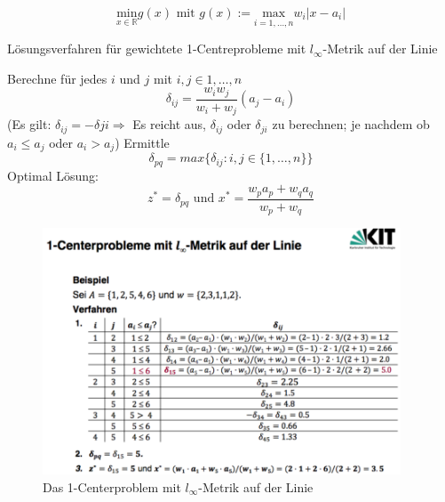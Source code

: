           \[
            \underset{x \in \mathbb{R}}{\text{min}}g(x) \text{ mit } g(x) := \underset{i = 1, \dots, n}{\text{max}}w_i|x-a_i|
          \]
          \begin{algorithm}[H]
            \caption{Lösungsverfahren für gewichtete 1-Centreprobleme mit $l_{\infty}$-Metrik auf der Linie}
            \begin{algorithmic}[1]
              \State Berechne für jedes $i$ und $j$ mit $i, j \in {1, \dots, n}$
              \begin{equation*}
                \delta_{ij} = \frac{w_iw_j}{w_i+w_j}(a_j - a_i)
              \end{equation*}
              (Es gilt: $\delta_{ij} = -\delta{ji} \Rightarrow $ Es reicht aus, $\delta_{ij}$ oder $\delta_{ji}$ zu berechnen; je nachdem ob $a_i \leq a_j$ oder $a_i > a_j$)
              \State Ermittle 
              \begin{equation*}
                \delta_{pq} = max\{\delta_{ij}: i, j \in \{1, \dots, n\}\}
              \end{equation*}
              \State Optimal Lösung:
              \begin{equation*}
                z^* = \delta_{pq} \text{ und } x^{*} = \frac{w_pa_p + w_qa_q}{w_p + w_q}
              \end{equation*}
              
            \end{algorithmic}
          \end{algorithm}

          \begin{exmp}
            
          \end{exmp}

          \begin{figure}[htbp]
            \centering
            \includegraphics[width=0.95\textwidth]{Images/Das_1_Centerproblem_auf_der_Linie_Bsp.png}
            \caption{Das 1-Centerproblem mit $l_{\infty}$-Metrik auf der Linie}
          \end{figure}

